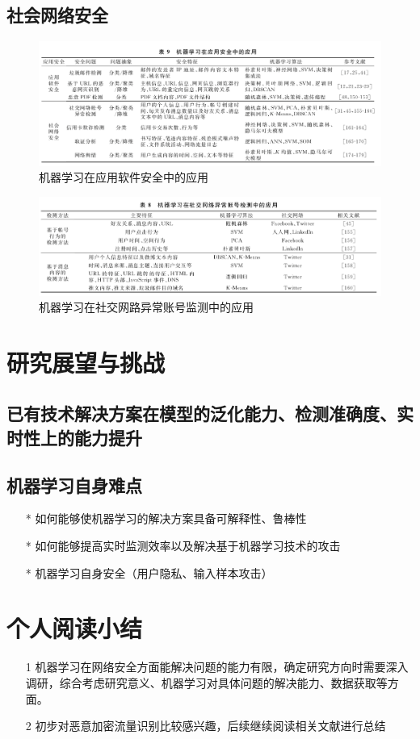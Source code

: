 \documentclass[UTF8]{ctexart}
\begin{document}
	\subsection{社会网络安全}
		\begin{figure}[ht]
        \centering
        \includegraphics[scale=0.5]{picture/008.png}
        \caption{机器学习在应用软件安全中的应用}
        \label{fig:008}
    \end{figure}
    \begin{figure}[ht]
        \centering
        \includegraphics[scale=0.5]{picture/009.png}
        \caption{机器学习在社交网路异常账号监测中的应用}
        \label{fig:009}
    \end{figure}
	\clearpage
	\section{研究展望与挑战}\label{sec:diwujie}
	\subsection{已有技术解决方案在模型的泛化能力、检测准确度、实时性上的能力提升}
	\subsection{机器学习自身难点}
	\begin{itemize}
	\item[*] 如何能够使机器学习的解决方案具备可解释性、鲁棒性 
	\item[*] 如何能够提高实时监测效率以及解决基于机器学习技术的攻击 
	\item[*] 机器学习自身安全（用户隐私、输入样本攻击）
	\end{itemize}
	\clearpage
	\section{个人阅读小结}\label{sec:diwujie}
	\begin{itemize}
	\item[1] 机器学习在网络安全方面能解决问题的能力有限，确定研究方向时需要深入调研，综合考虑研究意义、机器学习对具体问题的解决能力、数据获取等方面。
	\item[2] 初步对恶意加密流量识别比较感兴趣，后续继续阅读相关文献进行总结
	\end{itemize}
	\clearpage
	
\end{document}
